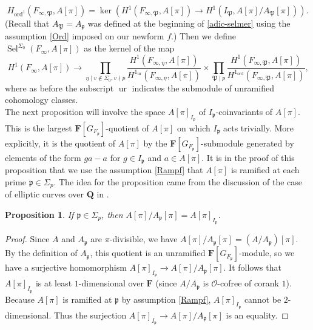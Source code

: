 \documentclass[12 pt]{amsart}
\theoremstyle{plain}
\newtheorem{prop}[thm]{Proposition}
\theoremstyle{definition}
\numberwithin{equation}{section}
\numberwithin{table}{section}
\begin{document}
\begin{equation*}
H_\operatorname{ord}^1(F_{\infty,\mathfrak{P}},A[\pi])=\ker(H^1(F_{\infty,\mathfrak{P}},A[\pi])\rightarrow H^1(I_\mathfrak{P},A[\pi]/A_\mathfrak{P}[\pi]))\text{.}
\end{equation*}
(Recall that $A_\mathfrak{P}=A_\mathfrak{p}$ was defined at the beginning of \cref{adic-selmer} using the assumption \cref{Ord} imposed on our newform $f$.)
Then we define $\operatorname{Sel}^{\Sigma_0}(F_\infty,A[\pi])$ as the kernel of the map
\begin{equation*}
H^1(F_\infty,A[\pi])\rightarrow\prod_{\eta\mid v\notin\Sigma_0,v\nmid p}\dfrac{H^1(F_{\infty,\eta},A[\pi])}{H^1_\operatorname{ur}(F_{\infty,\eta},A[\pi])}
\times\prod_{\mathfrak{P}\mid p}\dfrac{H^1(F_{\infty,\mathfrak{P}},A[\pi])}{H^1_\operatorname{ord}(F_{\infty,\mathfrak{P}},A[\pi])}\text{,}
\end{equation*}
where as before the subscript $\operatorname{ur}$ indicates the submodule of unramified cohomology classes.\\%
\indent The next proposition will involve the space $A[\pi]_{I_\mathfrak{p}}$ of $I_\mathfrak{p}$-coinvariants of $A[\pi]$. This is the largest $\mathbf{F}[G_{F_\mathfrak{p}}]$-quotient of $A[\pi]$ on which $I_\mathfrak{p}$ acts trivially. More explicitly, it is the quotient of $A[\pi]$ by the $\mathbf{F}[G_{F_\mathfrak{p}}]$-submodule generated by elements of the form $ga-a$ for $g\in I_\mathfrak{p}$ and $a\in A[\pi]$. It is in the proof of this proposition that we use the assumption \cref{Rampf} that $A[\pi]$ is ramified at each prime $\mathfrak{p}\in\Sigma_p$. The idea for the proposition came from the discussion of the case of elliptic curves over $\mathbf{Q}$ in \cite[\S 2]{Gr10}.
\begin{prop}
\label{max-unram}
If $\mathfrak{p}\in\Sigma_p$, then $A[\pi]/A_\mathfrak{p}[\pi]=A[\pi]_{I_\mathfrak{p}}$.
\end{prop}
\begin{proof}
Since $A$ and $A_\mathfrak{p}$ are $\pi$-divisible, we have $A[\pi]/A_\mathfrak{p}[\pi]=(A/A_\mathfrak{p})[\pi]$. By the definition of $A_\mathfrak{p}$, this quotient is an unramified $\mathbf{F}[G_{F_\mathfrak{p}}]$-module, so we have a surjective homomorphism $A[\pi]_{I_\mathfrak{p}}\rightarrow A[\pi]/A_\mathfrak{p}[\pi]$. It follows that $A[\pi]_{I_\mathfrak{p}}$ is at least $1$-dimensional over $\mathbf{F}$ (since $A/A_\mathfrak{p}$ is $\mathscr{O}$-cofree of corank $1$). Because $A[\pi]$ is ramified at $\mathfrak{p}$ by assumption \cref{Rampf}, $A[\pi]_{I_\mathfrak{p}}$ cannot be $2$-dimensional. Thus the surjection $A[\pi]_{I_\mathfrak{p}}\rightarrow A[\pi]/A_\mathfrak{p}[\pi]$ is an equality.
\end{proof}
\end{document}
